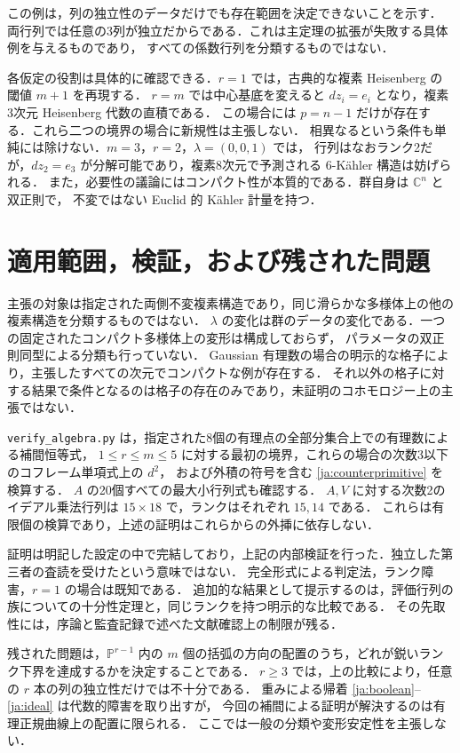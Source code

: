 \documentclass[12pt]{amsart}
\theoremstyle{definition}
\theoremstyle{remark}
\numberwithin{equation}{section}
\newcommand{\C}{\mathbb{C}}
\begin{document}
この例は，列の独立性のデータだけでも存在範囲を決定できないことを示す．
両行列では任意の3列が独立だからである．これは主定理の拡張が失敗する具体例を与えるものであり，
すべての係数行列を分類するものではない．

\begin{jrem}\label{ja:boundary}
各仮定の役割は具体的に確認できる．$r=1$ では，古典的な複素 Heisenberg の閾値 $m+1$ を再現する．
$r=m$ では中心基底を変えると $d z_i=e_i$ となり，複素3次元 Heisenberg 代数の直積である．
この場合には $p=n-1$ だけが存在する．これら二つの境界の場合に新規性は主張しない．
相異なるという条件も単純には除けない．$m=3$，$r=2$，$\lambda=(0,0,1)$ では，
行列はなおランク2だが，$d z_2=e_3$ が分解可能であり，複素8次元で予測される $6$-K\"ahler 構造は妨げられる．
また，必要性の議論にはコンパクト性が本質的である．群自身は $\C^n$ と双正則で，
不変ではない Euclid 的 K\"ahler 計量を持つ．
\end{jrem}

\section{適用範囲，検証，および残された問題}
主張の対象は指定された両側不変複素構造であり，同じ滑らかな多様体上の他の複素構造を分類するものではない．
$\lambda$ の変化は群のデータの変化である．一つの固定されたコンパクト多様体上の変形は構成しておらず，
パラメータの双正則同型による分類も行っていない．
Gaussian 有理数の場合の明示的な格子により，主張したすべての次元でコンパクトな例が存在する．
それ以外の格子に対する結果で条件となるのは格子の存在のみであり，未証明のコホモロジー上の主張ではない．

\texttt{verify\_algebra.py} は，指定された8個の有理点の全部分集合上での有理数による補間恒等式，
$1\leq r\leq m\leq5$ に対する最初の境界，これらの場合の次数3以下のコフレーム単項式上の $d^2$，
および外積の符号を含む \eqref{ja:counterprimitive} を検算する．
$A$ の20個すべての最大小行列式も確認する．
$A,V$ に対する次数2のイデアル乗法行列は $15\times18$ で，ランクはそれぞれ $15,14$ である．
これらは有限個の検算であり，上述の証明はこれらからの外挿に依存しない．

証明は明記した設定の中で完結しており，上記の内部検証を行った．独立した第三者の査読を受けたという意味ではない．
完全形式による判定法，ランク障害，$r=1$ の場合は既知である．
追加的な結果として提示するのは，評価行列の族についての十分性定理と，同じランクを持つ明示的な比較である．
その先取性には，序論と監査記録で述べた文献確認上の制限が残る．

残された問題は，$\mathbb P^{r-1}$ 内の $m$ 個の括弧の方向の配置のうち，どれが鋭いランク下界を達成するかを決定することである．
$r\geq3$ では，上の比較により，任意の $r$ 本の列の独立性だけでは不十分である．
重みによる帰着 \eqref{ja:boolean}--\eqref{ja:ideal} は代数的障害を取り出すが，
今回の補間による証明が解決するのは有理正規曲線上の配置に限られる．
ここでは一般の分類や変形安定性を主張しない．
\end{document}
